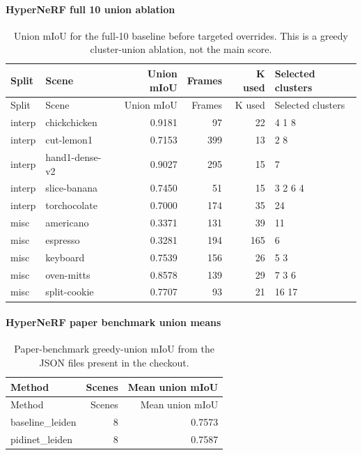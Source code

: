\documentclass[10pt]{article}
\begin{document}
\paragraph{HyperNeRF full 10 union ablation}
\small
\begin{longtable}{llrrrl}
\caption{Union mIoU for the full-10 baseline before targeted overrides.  This is a greedy cluster-union ablation, not the main score.}\\
\toprule
Split & Scene & Union mIoU & Frames & K used & Selected clusters \\
\midrule
\endfirsthead
\toprule
Split & Scene & Union mIoU & Frames & K used & Selected clusters \\
\midrule
\endhead
interp & chickchicken & 0.9181 & 97 & 22 & 4 1 8 \\
interp & cut-lemon1 & 0.7153 & 399 & 13 & 2 8 \\
interp & hand1-dense-v2 & 0.9027 & 295 & 15 & 7 \\
interp & slice-banana & 0.7450 & 51 & 15 & 3 2 6 4 \\
interp & torchocolate & 0.7000 & 174 & 35 & 24 \\
misc & americano & 0.3371 & 131 & 39 & 11 \\
misc & espresso & 0.3281 & 194 & 165 & 6 \\
misc & keyboard & 0.7539 & 156 & 26 & 5 3 \\
misc & oven-mitts & 0.8578 & 139 & 29 & 7 3 6 \\
misc & split-cookie & 0.7707 & 93 & 21 & 16 17 \\
\bottomrule
\end{longtable}
\normalsize

\paragraph{HyperNeRF paper benchmark union means}
\small
\begin{longtable}{lrr}
\caption{Paper-benchmark greedy-union mIoU from the JSON files present in the checkout.}\\
\toprule
Method & Scenes & Mean union mIoU \\
\midrule
\endfirsthead
\toprule
Method & Scenes & Mean union mIoU \\
\midrule
\endhead
baseline\_leiden & 8 & 0.7573 \\
pidinet\_leiden & 8 & 0.7587 \\
\bottomrule
\end{longtable}
\normalsize
\end{document}

